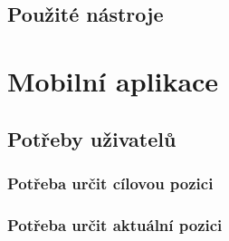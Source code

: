 \subsection{Použité nástroje}



\section{Mobilní aplikace}
\subsection{Potřeby uživatelů}
\subsubsection{Potřeba určit cílovou pozici}
\subsubsection{Potřeba určit aktuální pozici}
% 
% 
